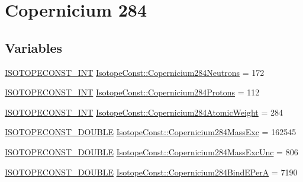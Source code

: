\hypertarget{group___isotope_const-_copernicium-_cn284}{}\section{Copernicium 284}
\label{group___isotope_const-_copernicium-_cn284}
\subsection*{Variables}
\begin{DoxyCompactItemize}
\item 
\mbox{\hyperlink{group___isotope_const-_macros_ga5f18360b3e99483a35c32d789e62621c}{I\+S\+O\+T\+O\+P\+E\+C\+O\+N\+S\+T\+\_\+\+I\+NT}} \mbox{\hyperlink{group___isotope_const-_copernicium-_cn284_ga89afa0b427a2159d5a518b698bdea9f7}{Isotope\+Const\+::\+Copernicium284\+Neutrons}} = 172
\item 
\mbox{\hyperlink{group___isotope_const-_macros_ga5f18360b3e99483a35c32d789e62621c}{I\+S\+O\+T\+O\+P\+E\+C\+O\+N\+S\+T\+\_\+\+I\+NT}} \mbox{\hyperlink{group___isotope_const-_copernicium-_cn284_gafc567194012e6346f36cfb2ab99b67db}{Isotope\+Const\+::\+Copernicium284\+Protons}} = 112
\item 
\mbox{\hyperlink{group___isotope_const-_macros_ga5f18360b3e99483a35c32d789e62621c}{I\+S\+O\+T\+O\+P\+E\+C\+O\+N\+S\+T\+\_\+\+I\+NT}} \mbox{\hyperlink{group___isotope_const-_copernicium-_cn284_gaed5b02f13df98fafb8b1926370813feb}{Isotope\+Const\+::\+Copernicium284\+Atomic\+Weight}} = 284
\item 
\mbox{\hyperlink{group___isotope_const-_macros_ga8f45a7272ce02c0b4c65c44636ed719a}{I\+S\+O\+T\+O\+P\+E\+C\+O\+N\+S\+T\+\_\+\+D\+O\+U\+B\+LE}} \mbox{\hyperlink{group___isotope_const-_copernicium-_cn284_ga319e6a17324e44ccebec0dd97625c00d}{Isotope\+Const\+::\+Copernicium284\+Mass\+Exc}} = 162545
\item 
\mbox{\hyperlink{group___isotope_const-_macros_ga8f45a7272ce02c0b4c65c44636ed719a}{I\+S\+O\+T\+O\+P\+E\+C\+O\+N\+S\+T\+\_\+\+D\+O\+U\+B\+LE}} \mbox{\hyperlink{group___isotope_const-_copernicium-_cn284_gafdeb47851cc8bb7e485a447ef4c2fe51}{Isotope\+Const\+::\+Copernicium284\+Mass\+Exc\+Unc}} = 806
\item 
\mbox{\hyperlink{group___isotope_const-_macros_ga8f45a7272ce02c0b4c65c44636ed719a}{I\+S\+O\+T\+O\+P\+E\+C\+O\+N\+S\+T\+\_\+\+D\+O\+U\+B\+LE}} \mbox{\hyperlink{group___isotope_const-_copernicium-_cn284_ga14eb2a592983fa30296ad23a45a4f122}{Isotope\+Const\+::\+Copernicium284\+Bind\+E\+PerA}} = 7190

\end{DoxyCompactItemize}
